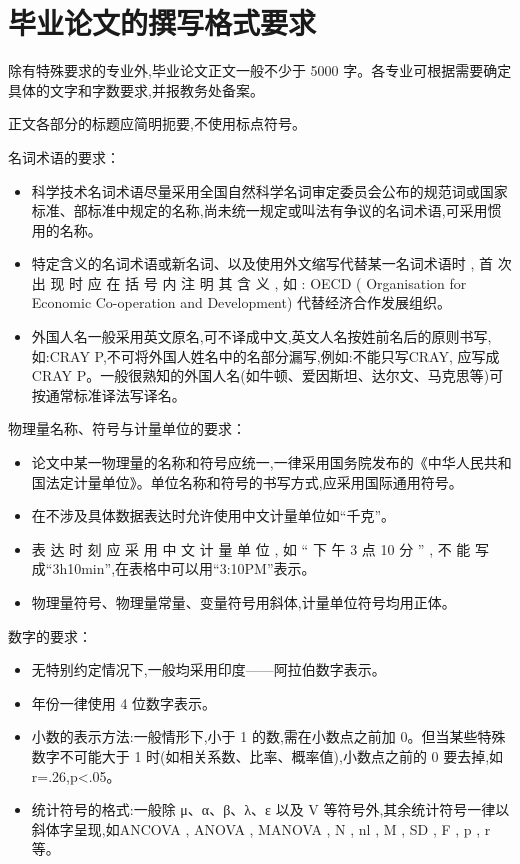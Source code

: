 ﻿\documentclass{sysuthesis}
\begin{document}
\section{毕业论文的撰写格式要求}

除有特殊要求的专业外,毕业论文正文一般不少于 5000 字。各专业可根据需要确定具体的文字和字数要求,并报教务处备案。

正文各部分的标题应简明扼要,不使用标点符号。

名词术语的要求：

\begin{itemize}
	\item 科学技术名词术语尽量采用全国自然科学名词审定委员会公布的规范词或国家标准、部标准中规定的名称,尚未统一规定或叫法有争议的名词术语,可采用惯用的名称。
	\item 特定含义的名词术语或新名词、以及使用外文缩写代替某一名词术语时 , 首 次 出 现 时 应 在 括 号 内 注 明 其 含 义 , 如 : OECD ( Organisation for Economic Co-operation and Development) 代替经济合作发展组织。
	\item 外国人名一般采用英文原名,可不译成中文,英文人名按姓前名后的原则书写,如:CRAY P,不可将外国人姓名中的名部分漏写,例如:不能只写CRAY, 应写成 CRAY P。一般很熟知的外国人名(如牛顿、爱因斯坦、达尔文、马克思等)可按通常标准译法写译名。
\end{itemize}

物理量名称、符号与计量单位的要求：

\begin{itemize}
	\item 论文中某一物理量的名称和符号应统一,一律采用国务院发布的《中华人民共和国法定计量单位》。单位名称和符号的书写方式,应采用国际通用符号。
	\item 在不涉及具体数据表达时允许使用中文计量单位如“千克”。
	\item 表 达 时 刻 应 采 用 中 文 计 量 单 位 , 如 “ 下 午 3 点 10 分 ” , 不 能 写 成“3h10min”,在表格中可以用“3:10PM”表示。
	\item 物理量符号、物理量常量、变量符号用斜体,计量单位符号均用正体。
\end{itemize}

数字的要求：

\begin{itemize}
	\item 无特别约定情况下,一般均采用印度——阿拉伯数字表示。
	\item 年份一律使用 4 位数字表示。
	\item 小数的表示方法:一般情形下,小于 1 的数,需在小数点之前加 0。但当某些特殊数字不可能大于 1 时(如相关系数、比率、概率值),小数点之前的 0 要去掉,如 r=.26,p<.05。
	\item 统计符号的格式:一般除 μ、α、β、λ、ε 以及 V 等符号外,其余统计符号一律以斜体字呈现,如ANCOVA , ANOVA , MANOVA , N , nl , M , SD , F , p , r 等。
\end{itemize}
\end{document}
